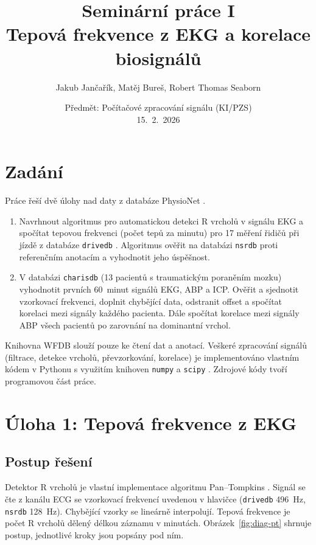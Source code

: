 \documentclass[11pt,a4paper]{article}
\title{\textbf{Seminární práce I}\\[2pt]
       Tepová frekvence z EKG a korelace biosignálů}
\author{Jakub Jančařík, Matěj Bureš, Robert Thomas Seaborn}
\date{Předmět: Počítačové zpracování signálu (KI/PZS)\\[2pt] 15.~2.~2026}
\begin{document}
\maketitle

\section{Zadání}
Práce řeší dvě úlohy nad daty z databáze PhysioNet \cite{physionet}.

\begin{enumerate}[label=\textbf{Úloha \arabic*.}, leftmargin=*, labelsep=0.6em]
  \item Navrhnout algoritmus pro automatickou detekci R vrcholů v signálu EKG a
        spočítat tepovou frekvenci (počet tepů za minutu) pro 17 měření řidičů při jízdě
        z databáze \texttt{drivedb} \cite{drivedb}. Algoritmus ověřit na databázi
        \texttt{nsrdb} proti referenčním anotacím a vyhodnotit jeho úspěšnost.
  \item V databázi \texttt{charisdb} \cite{charisdb} (13 pacientů s traumatickým poraněním mozku)
        vyhodnotit prvních 60~minut signálů EKG, ABP a ICP. Ověřit a sjednotit vzorkovací
        frekvenci, doplnit chybějící data, odstranit offset a spočítat korelaci mezi signály
        každého pacienta. Dále spočítat korelace mezi signály ABP všech pacientů po zarovnání
        na dominantní vrchol.
\end{enumerate}

Knihovna WFDB slouží pouze ke čtení dat a anotací. Veškeré zpracování signálů (filtrace,
detekce vrcholů, převzorkování, korelace) je implementováno vlastním kódem v Pythonu
s využitím knihoven \texttt{numpy} a \texttt{scipy} \cite{scipy}. Zdrojové kódy tvoří programovou část práce.

\section{Úloha 1: Tepová frekvence z EKG}
\subsection{Postup řešení}
Detektor R vrcholů je vlastní implementace algoritmu Pan--Tompkins \cite{pantompkins}.
Signál se čte z kanálu ECG se vzorkovací frekvencí uvedenou v hlavičce (\texttt{drivedb}
496~Hz, \texttt{nsrdb} 128~Hz). Chybějící vzorky se lineárně interpolují. Tepová frekvence je
počet R vrcholů dělený délkou záznamu v minutách. Obrázek~\ref{fig:diag-pt} shrnuje postup,
jednotlivé kroky jsou popsány pod ním.
\end{document}
